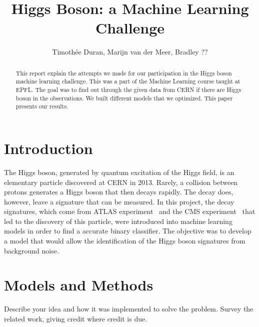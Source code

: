 \documentclass[10pt,conference,compsocconf]{IEEEtran}
\begin{document}
\title{Higgs Boson: a Machine Learning Challenge}

\author{
  Timothée Duran, Marijn van der Meer, Bradley ?? 
}

\maketitle

\begin{abstract}

 This report explain the attempts we made for our participation in the Higgs boson machine learning challenge. This was a part of the Machine Learning course taught at EPFL. The goal was to find out through the given data from CERN if there are Higgs boson in the observations. We built different models that we optimized. This paper presents our results. 
\end{abstract}

\section{Introduction}\label{sec: introduction}
The Higgs boson, generated by quantum excitation of the Higgs field, is an elementary particle discovered at CERN in 2013. Rarely, a collision between protons generates a Higgs boson that then decays rapidly. The decay does, however, leave a signature that can be measured. In this project, the decay signatures, which come from ATLAS experiment~\cite{Aad_2012} and the CMS experiment~\cite{Chatrchyan_2012} that led to the discovery of this particle, were introduced into machine learning models in order to find a accurate binary classifier. The objective was to develop a model that would allow the identification of the Higgs boson signatures from background noise.
\section{Models and Methods}\label{sec: models_methods}
Describe your idea and how it was implemented to solve
  the problem. Survey the related work, giving credit where credit is
  due.
\end{document}
